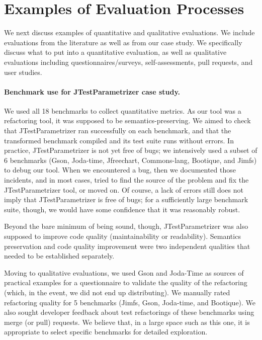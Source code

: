 \section{Examples of Evaluation Processes}
\label{sec:our-evaluation-process}

We next discuss examples of quantitative and qualitative
evaluations. We include evaluations from the literature as well as
from our case study. We specifically discuss what to put into
a quantitative evaluation, as well as qualitative evaluations
including questionnaires/surveys, self-assessments, pull requests,
and user studies.

\paragraph{Benchmark use for JTestParametrizer case study.} 
We used all 18 benchmarks to collect quantitative
metrics. As our tool was a refactoring tool, it was supposed to be
semantics-preserving. We aimed to check that JTestParametrizer ran
successfully on each benchmark, and that the transformed benchmark
compiled and its test suite runs without errors.  In practice,
JTestParametrizer is not yet free of bugs; we intensively used a
subset of 6 benchmarks (Gson, Joda-time, Jfreechart, Commons-lang,
Bootique, and Jimfs) to debug our tool.  When we encountered a bug,
then we documented those incidents, and in most cases, tried to find
the source of the problem and fix the JTestParametrizer tool, or moved
on. Of course, a lack of errors still does not imply that
JTestParametrizer is free of bugs; for a sufficiently large benchmark suite,
though, we would have some confidence that it was reasonably robust.

Beyond the bare minimum of being sound, though, JTestParametrizer was
also supposed to improve code quality (maintainability or
readability). Semantics preservation and code quality improvement were
two independent qualities that needed to be established separately.

Moving to qualitative evaluations, we used Gson and Joda-Time as
sources of practical examples for a questionnaire to validate the
quality of the refactoring (which, in the event, we did not end up
distributing).  We manually rated refactoring quality for 5 benchmarks
(Jimfs, Gson, Joda-time, and Bootique). We also sought developer
feedback about test refactorings of these benchmarks using merge (or pull)
requests.  We believe that, in a large space such as this one, it is
appropriate to select specific benchmarks for detailed exploration.

